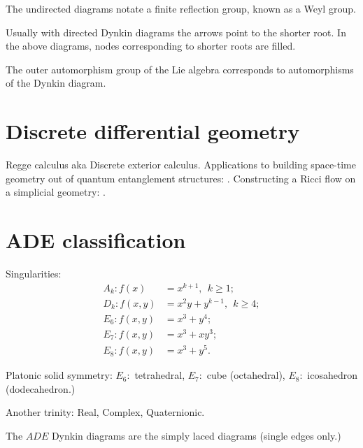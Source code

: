 \documentclass[12pt]{article}
\begin{document}
The undirected diagrams notate a finite reflection group,
known as a Weyl group.

Usually with directed Dynkin diagrams the arrows point to the shorter root.
In the above diagrams, nodes corresponding to shorter roots are filled.

The outer automorphism group of the Lie algebra
corresponds to automorphisms of the Dynkin diagram.


%
%

\section{Discrete differential geometry}

Regge calculus aka Discrete exterior calculus.
Applications to building space-time geometry out of
quantum entanglement structures: \cite{Cao2016}.
Constructing a Ricci flow on a simplicial geometry: \cite{Miller2014}.


%
%

\section{ADE classification}

Singularities:
\begin{align*}
A_k:f(x)   &= x^{k+1}, \ \ k\ge 1;\\
D_k:f(x,y) &= x^2y + y^{k-1},\ \  k\ge 4;\\
E_6:f(x,y) &= x^3 + y^4;\\
E_7:f(x,y) &= x^3 + xy^3;\\
E_8:f(x,y) &= x^3 + y^5.
\end{align*}

Platonic solid symmetry:
$E_6:$ tetrahedral, $E_7:$ cube (octahedral), $E_8:$ icosahedron (dodecahedron.)

Another trinity: Real, Complex, Quaternionic.

The $ADE$ Dynkin diagrams are the simply laced diagrams (single edges only.)


\end{document}
